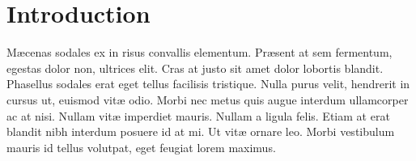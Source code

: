 %

%
%
%

\section{Introduction} %

M\ae{}cenas sodales ex in risus convallis elementum. Pr\ae{}sent at sem fermentum, egestas dolor non, ultrices elit. Cras at justo sit amet dolor lobortis blandit. Phasellus sodales erat eget tellus facilisis tristique. Nulla purus velit, hendrerit in cursus ut, euismod vit\ae{} odio. Morbi nec metus quis augue interdum ullamcorper ac at nisi. Nullam vit\ae{} imperdiet mauris. Nullam a ligula felis. Etiam at erat blandit nibh interdum posuere id at mi. Ut vit\ae{} ornare leo. Morbi vestibulum mauris id tellus volutpat, eget feugiat lorem maximus.

